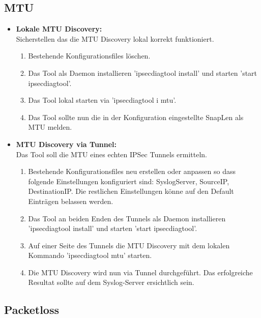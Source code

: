\subsection{MTU}
\begin{itemize}
\item[\Square] \textbf{Lokale MTU Discovery:}\\
Sicherstellen das die MTU Discovery lokal korrekt funktioniert.
\begin{enumerate} \itemsep1pt \parskip0pt 
  \item Bestehende Konfigurationsfiles löschen.  
  \item Das Tool als Daemon installieren 'ipsecdiagtool install' und starten 'start ipsecdiagtool'.
  \item Das Tool lokal starten via 'ipsecdiagtool i mtu'.
  \item Das Tool sollte nun die in der Konfiguration eingestellte SnapLen als MTU melden.
\end{enumerate}
			   
\item[\Square] \textbf{MTU Discovery via Tunnel:}\\
Das Tool soll die MTU eines echten IPSec Tunnels ermitteln.
\begin{enumerate} \itemsep1pt \parskip0pt 
  \item Bestehende Konfigurationsfiles neu erstellen oder anpassen so dass folgende Einstellungen konfiguriert sind: SyslogServer, SourceIP, DestinationIP. Die restlichen Einstellungen könne auf den Default Einträgen belassen werden.
  \item Das Tool an beiden Enden des Tunnels als Daemon installieren 'ipsecdiagtool install' und starten 'start ipsecdiagtool'.
  \item Auf einer Seite des Tunnels die MTU Discovery mit dem lokalen Kommando 'ipsecdiagtool mtu' starten.
  \item Die MTU Discovery wird nun via Tunnel durchgeführt. Das erfolgreiche Resultat sollte auf dem Syslog-Server ersichtlich sein.
\end{enumerate}
		

\end{itemize}
\subsection{Packetloss}
